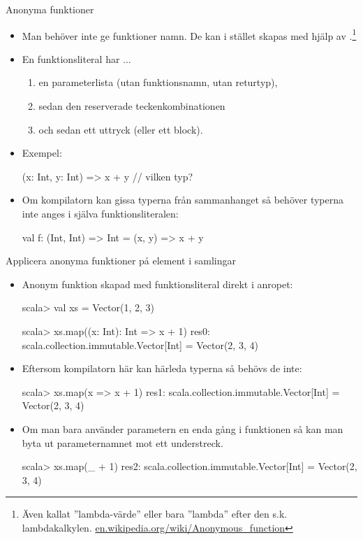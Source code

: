\begin{Slide}{Anonyma funktioner}
\begin{itemize}
\item  Man behöver inte ge funktioner namn. De kan i stället skapas med hjälp av .\footnote{Även kallat ''lambda-värde'' eller bara ''lambda'' efter den s.k. lambdakalkylen. \href{https://en.wikipedia.org/wiki/Anonymous_function}{en.wikipedia.org/wiki/Anonymous\_function}}

\item En funktionsliteral har ...
\begin{enumerate}
\item en parameterlista (utan funktionsnamn, utan returtyp),
\item sedan den reserverade teckenkombinationen \code{=>}
\item och sedan ett uttryck (eller ett block).
\end{enumerate}
\pause
\item Exempel:
\begin{Code}[basicstyle=\ttfamily\SlideFontSize{9}{11}]
(x: Int, y: Int) => x + y             // vilken typ?
\end{Code}
\pause
\item Om kompilatorn kan gissa typerna från sammanhanget så behöver typerna inte anges i själva  funktionsliteralen:
\begin{Code}[basicstyle=\ttfamily\SlideFontSize{9}{11}]
val f: (Int, Int) => Int = (x, y) => x + y
\end{Code}
\end{itemize}
\end{Slide}


\begin{Slide}{Applicera anonyma funktioner på element i samlingar}\SlideFontSmall
\begin{itemize}
\item Anonym funktion skapad med funktionsliteral direkt i anropet:
\begin{REPL}
scala> val xs = Vector(1, 2, 3)

scala> xs.map((x: Int): Int => x + 1)
res0: scala.collection.immutable.Vector[Int] = Vector(2, 3, 4)
\end{REPL}

\pause
\item Eftersom kompilatorn här kan härleda typerna så behövs de inte:
\begin{REPL}
scala> xs.map(x => x + 1)
res1: scala.collection.immutable.Vector[Int] = Vector(2, 3, 4)
\end{REPL}
\pause

\item Om man bara använder parametern en enda gång i funktionen så kan man byta ut parameternamnet mot ett understreck.

\begin{REPL}
scala> xs.map(_ + 1)
res2: scala.collection.immutable.Vector[Int] = Vector(2, 3, 4)
\end{REPL}
\end{itemize}
\end{Slide}



